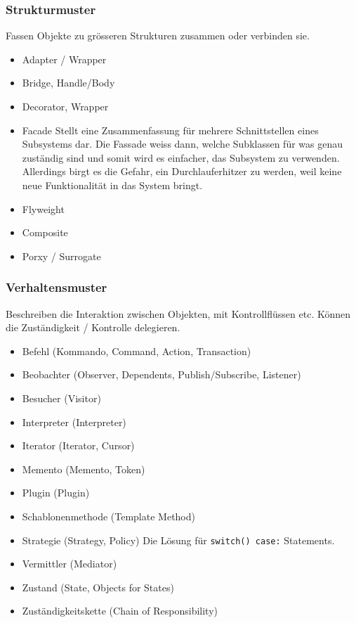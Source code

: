 \subsubsection{Strukturmuster}
Fassen Objekte zu grösseren Strukturen zusammen oder verbinden sie.
\begin{itemize}
    \item Adapter / Wrapper
    \item Bridge, Handle/Body
    \item Decorator, Wrapper
    \item Facade
    \subitem
    Stellt eine Zusammenfassung für mehrere Schnittstellen eines Subsystems dar. Die Fassade weiss dann, welche Subklassen für was genau zuständig sind und somit wird es einfacher, das Subsystem zu verwenden. Allerdings birgt es die Gefahr, ein Durchlauferhitzer zu werden, weil keine neue Funktionalität in das System bringt.
    \item Flyweight
    \item Composite
    \item Porxy / Surrogate
\end{itemize}
\subsubsection{Verhaltensmuster}
Beschreiben die Interaktion zwischen Objekten, mit Kontrollflüssen etc. Können die Zuständigkeit / Kontrolle delegieren.
\begin{itemize}
    \item Befehl (Kommando, Command, Action, Transaction)
    \item Beobachter (Observer, Dependents, Publish/Subscribe, Listener)
    \item Besucher (Visitor)
    \item Interpreter (Interpreter)
    \item Iterator (Iterator, Cursor)
    \item Memento (Memento, Token)
    \item Plugin (Plugin)
    \item Schablonenmethode (Template Method)
    \item Strategie (Strategy, Policy)
    \subitem Die Lösung für \verb|switch() case:| Statements. 
    \item Vermittler (Mediator)
    \item Zustand (State, Objects for States)
    \item Zuständigkeitskette (Chain of Responsibility)
\end{itemize}

